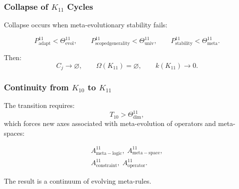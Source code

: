\subsubsection{Collapse of $K_{11}$ Cycles}

Collapse occurs when meta-evolutionary stability fails:

\[
   P^{11}_{\mathrm{adapt}} < \Theta^{11}_{\mathrm{evol}},\qquad
   P^{11}_{\mathrm{scoped generality}} < \Theta^{11}_{\mathrm{univ}},\qquad
   P^{11}_{\mathrm{stability}} < \Theta^{11}_{\mathrm{meta}}.
\]

Then:
\[
  C_j\to\varnothing,\qquad
  \Omega(K_{11})=\varnothing,\qquad
  k(K_{11})\to 0.
\]


\subsubsection{Continuity from $K_{10}$ to $K_{11}$}

The transition requires:
\[
  T_{10}>\Theta^{11}_{\mathrm{dim}},
\]
which forces new axes associated with meta-evolution of operators and
meta-spaces:

\[
  \begin{aligned}
  A^{11}_{\mathrm{meta\!-\!logic}},\;
  A^{11}_{\mathrm{meta\!-\!space}},\\
  A^{11}_{\mathrm{constraint}},\;
  A^{11}_{\mathrm{operator}}.
  \end{aligned}
\]

The result is a continuum of evolving meta-rules.
